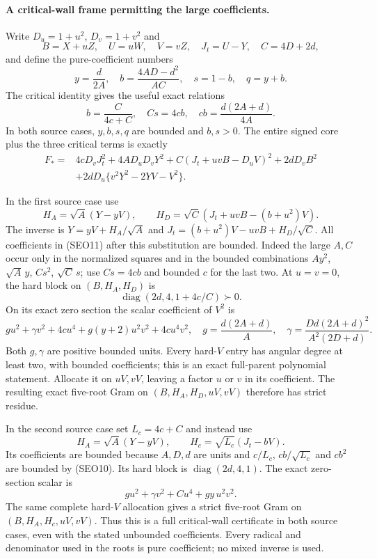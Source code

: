 \paragraph{A critical-wall frame permitting the large coefficients.}
Write $D_u=1+u^2$, $D_v=1+v^2$ and
\[
 B=X+uZ,\quad U=uW,\quad V=vZ,\quad J_t=U-Y,
 \quad C=4D+2d,
\]
and define the pure-coefficient numbers
\[
 y=\frac d{2A},\quad
 b=\frac{4AD-d^2}{AC},\quad s=1-b,\quad q=y+b.
\]
The critical identity gives the useful exact relations
\[
 b=\frac C{4c+C},\quad Cs=4cb,\quad
 cb=\frac{d(2A+d)}{4A}.                         \tag{SEO10}
\]
In both source cases, $y,b,s,q$ are bounded and $b,s>0$.
The entire signed core plus the three critical terms is exactly
\begin{align*}
 F_*={}&4cD_vJ_t^2+4AD_uD_vY^2
       +C(J_t+uvB-D_uV)^2+2dD_vB^2\\
       &+2dD_u\{v^2Y^2-2YV-V^2\}.              \tag{SEO11}
\end{align*}

In the first source case use
\[
 H_A=\sqrt A(Y-yV),\qquad
 H_D=\sqrt C(J_t+uvB-(b+u^2)V).
 \tag{SEO12}
\]
The inverse is $Y=yV+H_A/\sqrt A$ and
$J_t=(b+u^2)V-uvB+H_D/\sqrt C$.
All coefficients in (SEO11) after this substitution are bounded.
Indeed the large $A,C$ occur only in the normalized squares and in
the bounded combinations $Ay^2$, $\sqrt A\,y$, $Cs^2$,
$\sqrt C\,s$; use $Cs=4cb$ and bounded $c$ for the last two.
At $u=v=0$, the hard block on $(B,H_A,H_D)$ is
\[
 \operatorname{diag}(2d,4,1+4c/C)\succ0.
\]
On its exact zero section the scalar coefficient of $V^2$ is
\[
 g u^2+\gamma v^2+4cu^4+g(y+2)u^2v^2+4cu^4v^2,
 \quad g=\frac{d(2A+d)}A,\quad
 \gamma=\frac{Dd(2A+d)^2}{A^2(2D+d)}.             \tag{SEO13}
\]
Both $g,\gamma$ are positive bounded units. Every hard-$V$ entry
has angular degree at least two, with bounded coefficients; this is
an exact full-parent polynomial statement. Allocate it on $uV,vV$,
leaving a factor $u$ or $v$ in its coefficient. The resulting exact
five-root Gram on $(B,H_A,H_D,uV,vV)$ therefore has strict residue.

In the second source case set $L_c=4c+C$ and instead use
\[
 H_A=\sqrt A(Y-yV),\qquad
 H_c=\sqrt{L_c}(J_t-bV).                         \tag{SEO14}
\]
Its coefficients are bounded because $A,D,d$ are units and
$c/L_c$, $cb/\sqrt{L_c}$ and $cb^2$ are bounded by (SEO10).
Its hard block is $\operatorname{diag}(2d,4,1)$.
The exact zero-section scalar is
\[
 g u^2+\gamma v^2+C u^4+gy\,u^2v^2.
 \tag{SEO15}
\]
The same complete hard-$V$ allocation gives a strict five-root
Gram on $(B,H_A,H_c,uV,vV)$. Thus this is a full critical-wall
certificate in both source cases, even with the stated unbounded
coefficients. Every radical and denominator used in the roots is
pure coefficient; no mixed inverse is used.

